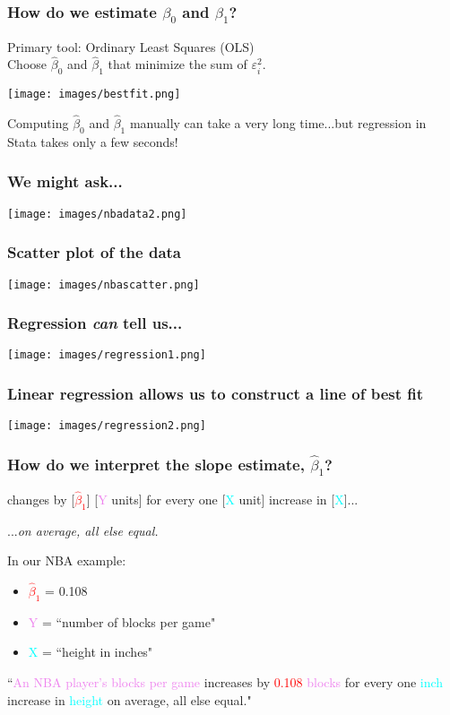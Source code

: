 \documentclass[11pt]{beamer}
\newcommand{\red}{\textcolor{red}}
\newcommand{\purple}{\textcolor{violet}}
\newcommand{\cyan}{\textcolor{cyan}}
\begin{document}
\begin{frame}
\frametitle{How do we estimate $\beta_0$ and $\beta_1$?}
Primary tool: \alert{Ordinary Least Squares (OLS)} \\ \bigskip
Choose $\hat{\beta}_0$ and $\hat{\beta}_1$ that minimize the sum of $\varepsilon_i^2$. 
\begin{center}
	\texttt{[image: images/bestfit.png]}
\end{center} \pause
Computing $\hat{\beta}_0$ and $\hat{\beta}_1$ manually can take a very long time...but regression in Stata takes only a few seconds!
\end{frame}

\begin{frame}
\frametitle{We might ask...}
\begin{center}
	\texttt{[image: images/nbadata2.png]}
\end{center}
\end{frame}

\begin{frame}
\frametitle{Scatter plot of the data}
\begin{center}
	\texttt{[image: images/nbascatter.png]}
\end{center}
\end{frame}

\begin{frame}
\frametitle{Regression \textit{can} tell us...}
\begin{center}
	\texttt{[image: images/regression1.png]}
\end{center}
\end{frame}

\begin{frame}
\frametitle{Linear regression allows us to construct a line of best fit}
\begin{center}
	\texttt{[image: images/regression2.png]}
\end{center}
\end{frame}

\begin{frame}
\frametitle{How do we interpret the \alert{slope} estimate, $\hat{\beta}_1$?}
\begin{tcolorbox}[]
 	[\purple{Y}] changes by [\red{$\hat{\beta}_1$}] [\purple{Y} units] for every one [\cyan{X} unit] increase in [\cyan{X}]... 
 	\begin{flushright}
 		...\textit{on average, all else equal.}
 	\end{flushright}
\end{tcolorbox}
In our NBA example:
\begin{itemize}
	\item \red{$\hat{\beta}_1$} = 0.108
	\item \purple{Y} = ``number of blocks per game"
	\item \cyan{X} = ``height in inches"
\end{itemize}  \pause \bigskip
``\purple{An NBA player's blocks per game} increases by \red{0.108} \purple{blocks} for every one \cyan{inch} increase in \cyan{height} on average, all else equal."
\end{frame}
\end{document}
